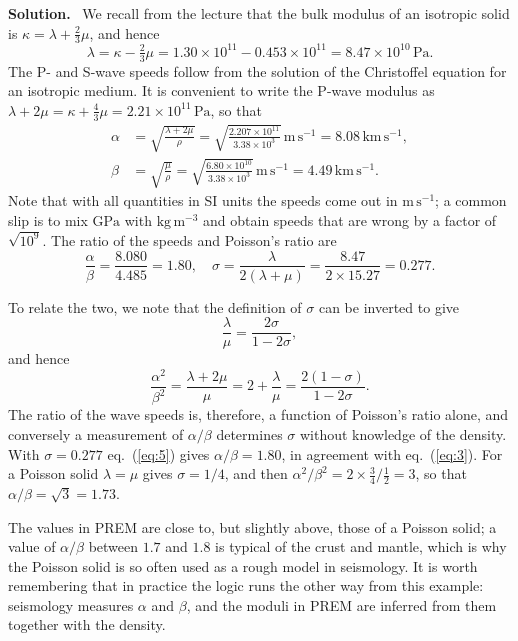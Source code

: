 \documentclass[a4paper,12pt]{paper}
\newcounter{example}
\newenvironment{solution}{\par\noindent\textbf{Solution.}\ }{\par\medskip}
\begin{document}
\begin{solution}
We recall from the lecture that the bulk modulus of an isotropic solid is $\kappa=\lambda+\tfrac{2}{3}\mu$, and hence
\begin{equation}
\lambda=\kappa-\tfrac{2}{3}\mu=1.30\times10^{11}-0.453\times10^{11}=8.47\times10^{10}\,\mathrm{Pa}.
\label{eq:1}
\end{equation}
The P- and S-wave speeds follow from the solution of the Christoffel equation for an isotropic
medium. It is convenient to write the P-wave modulus as
$\lambda+2\mu=\kappa+\tfrac{4}{3}\mu=2.21\times10^{11}\,\mathrm{Pa}$, so that
\begin{equation}
\begin{split}
\alpha&=\sqrt{\frac{\lambda+2\mu}{\rho}}=\sqrt{\frac{2.207\times10^{11}}{3.38\times10^{3}}}\,\mathrm{m\,s^{-1}}
=8.08\,\mathrm{km\,s^{-1}},\\
\beta&=\sqrt{\frac{\mu}{\rho}}=\sqrt{\frac{6.80\times10^{10}}{3.38\times10^{3}}}\,\mathrm{m\,s^{-1}}
=4.49\,\mathrm{km\,s^{-1}}.
\end{split}
\label{eq:2}
\end{equation}
Note that with all quantities in SI units the speeds come out in $\mathrm{m\,s^{-1}}$; a
common slip is to mix $\mathrm{GPa}$ with $\mathrm{kg\,m^{-3}}$ and obtain speeds that are
wrong by a factor of $\sqrt{10^{9}}$. The ratio of the speeds and Poisson's ratio are
\begin{equation}
\frac{\alpha}{\beta}=\frac{8.080}{4.485}=1.80,\quad
\sigma=\frac{\lambda}{2(\lambda+\mu)}=\frac{8.47}{2\times15.27}=0.277.
\label{eq:3}
\end{equation}

To relate the two, we note that the definition of $\sigma$ can be inverted to give
\begin{equation}
\frac{\lambda}{\mu}=\frac{2\sigma}{1-2\sigma},
\label{eq:4}
\end{equation}
and hence
\begin{equation}
\frac{\alpha^{2}}{\beta^{2}}=\frac{\lambda+2\mu}{\mu}=2+\frac{\lambda}{\mu}=\frac{2(1-\sigma)}{1-2\sigma}.
\label{eq:5}
\end{equation}
The ratio of the wave speeds is, therefore, a function of Poisson's ratio alone, and conversely
a measurement of $\alpha/\beta$ determines $\sigma$ without knowledge of the density. With
$\sigma=0.277$ eq.~(\ref{eq:5}) gives $\alpha/\beta=1.80$, in agreement with eq.~(\ref{eq:3}).
For a Poisson solid $\lambda=\mu$ gives $\sigma=1/4$, and then
$\alpha^{2}/\beta^{2}=2\times\tfrac{3}{4}/\tfrac{1}{2}=3$, so that $\alpha/\beta=\sqrt{3}=1.73$.

The values in PREM are close to, but slightly above, those of a Poisson solid; a value of
$\alpha/\beta$ between $1.7$ and $1.8$ is typical of the crust and mantle, which is why the
Poisson solid is so often used as a rough model in seismology. It is worth remembering that in
practice the logic runs the other way from this example: seismology measures $\alpha$ and
$\beta$, and the moduli in PREM are inferred from them together with the density.
\end{solution}
\end{document}
